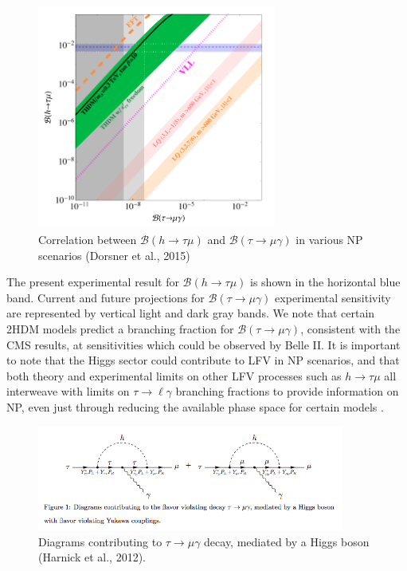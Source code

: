 \documentclass[12pt]{thesis}  %
\newcommand{\br}{\mathcal{B}}
\newcommand{\tmg}{\tau\to\mu\gamma}
\newcommand{\tlg}{\tau\to\ell\gamma}
\newcommand{\htm}{h\to \tau \mu}
\begin{document}
\begin{figure}[h]
\centering
\includegraphics[width=0.7\textwidth]{images/h-vs-tau.png}
\caption{Correlation between $\br(\htm)$ and $\br(\tmg)$ in various NP scenarios (Dorsner et al., 2015)}
\label{}
\end{figure}

The present experimental result for $\br(\htm)$ is shown in the horizontal blue band. Current and future projections for $\br(\tmg)$ experimental sensitivity are represented by vertical light and dark gray bands. We note that certain 2HDM models predict a branching fraction for $\br(\tmg)$, consistent with the CMS results, at sensitivities which could be observed by Belle II. It is important to note that the Higgs sector could contribute to LFV in NP scenarios, and that both theory and experimental limits on other LFV processes such as $\htm$ all interweave with limits on $\tlg$ branching fractions to provide information on NP, even just through reducing the available phase space for certain models \cite{Dorsner:2015}.

\begin{figure}[h]
\centering
\includegraphics[width=0.9\textwidth]{images/higgs-lfv-modes.png}
\caption[]%
{{\small Diagrams contributing to $\tmg$ decay, mediated by a Higgs boson (Harnick et al., 2012).}}
\label{}
\end{figure}
\end{document}

